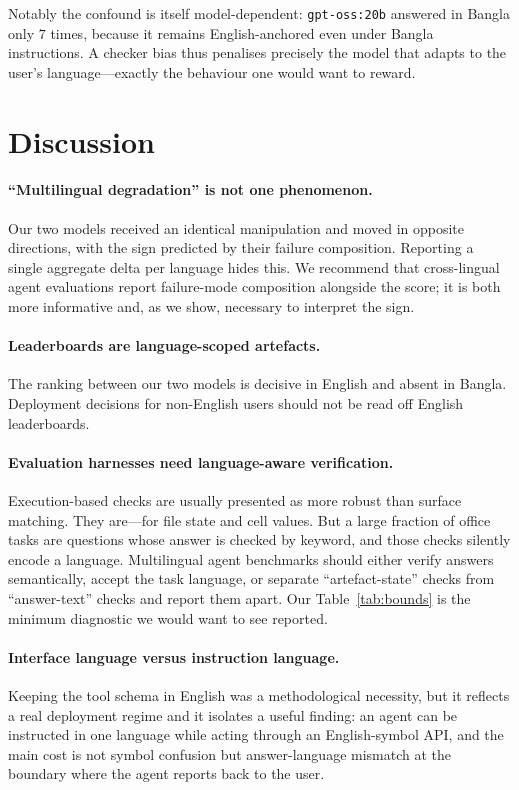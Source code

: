 \documentclass[11pt]{article}
\begin{document}
Notably the confound is itself model-dependent: \texttt{gpt-oss:20b} answered in Bangla only $7$
times, because it remains English-anchored even under Bangla instructions. A checker bias thus
penalises precisely the model that adapts to the user's language---exactly the behaviour one
would want to reward.

\section{Discussion}

\paragraph{``Multilingual degradation'' is not one phenomenon.} Our two models received an
identical manipulation and moved in opposite directions, with the sign predicted by their
failure composition. Reporting a single aggregate delta per language hides this. We recommend
that cross-lingual agent evaluations report failure-mode composition alongside the score; it is
both more informative and, as we show, necessary to interpret the sign.

\paragraph{Leaderboards are language-scoped artefacts.} The ranking between our two models is
decisive in English and absent in Bangla. Deployment decisions for non-English users should not
be read off English leaderboards.

\paragraph{Evaluation harnesses need language-aware verification.} Execution-based checks are
usually presented as more robust than surface matching. They are---for file state and cell
values. But a large fraction of office tasks are questions whose answer is checked by keyword,
and those checks silently encode a language. Multilingual agent benchmarks should either verify
answers semantically, accept the task language, or separate ``artefact-state'' checks from
``answer-text'' checks and report them apart. Our Table~\ref{tab:bounds} is the minimum
diagnostic we would want to see reported.

\paragraph{Interface language versus instruction language.} Keeping the tool schema in English
was a methodological necessity, but it reflects a real deployment regime and it isolates a
useful finding: an agent can be instructed in one language while acting through an
English-symbol API, and the main cost is not symbol confusion but answer-language mismatch at
the boundary where the agent reports back to the user.
\end{document}
